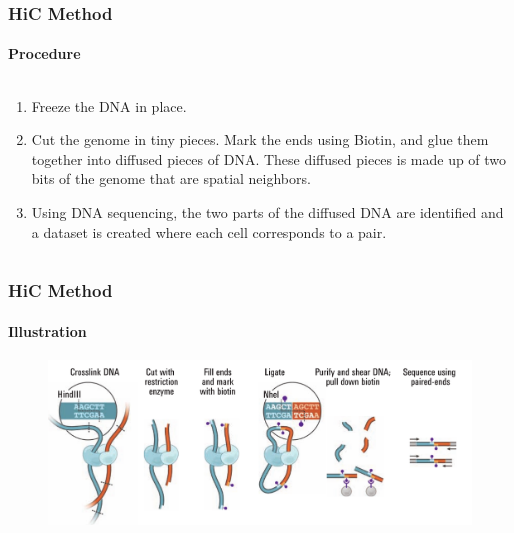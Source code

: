\documentclass{beamer}
\begin{document}
\begin{frame}
    \frametitle{HiC Method}
    \framesubtitle{Procedure}
    \begin{columns}
        \begin{column}{1.1\textwidth}
            \begin{enumerate}
                \item Freeze the DNA in place.
                \item Cut the genome in tiny pieces.
                    Mark the ends using Biotin, and glue them together into
                    diffused pieces of DNA. These diffused pieces is made
                    up of two bits of the genome that are spatial neighbors.
                \item Using DNA sequencing, the two parts of the 
                    diffused DNA are identified and a dataset is created
                    where each cell corresponds to a pair.
            \end{enumerate}
        \end{column}
    \end{columns}
\end{frame}
\begin{frame}
    \frametitle{HiC Method}
    \framesubtitle{Illustration}
    \begin{figure}
        \centering
        \includegraphics[width=1.1\textwidth]{figures/hic_process.png}
        \caption*{ \cite{lieberman2009comprehensive}}
    \end{figure}
\end{frame}
\end{document}
